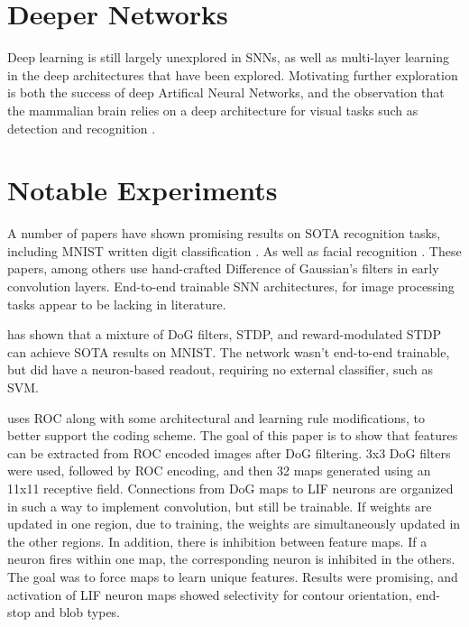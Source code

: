     \section{Deeper Networks}
    Deep learning is still largely unexplored in SNNs, as well as multi-layer
    learning in the deep architectures that have been explored. Motivating
    further exploration is both the success of deep Artifical Neural Networks,
    and the observation that the mammalian brain relies on a deep architecture
    for visual tasks such as detection and recognition \cite{tavanaei_2019}.
    
    \section{Notable Experiments}
    A number of papers have shown promising results on SOTA recognition tasks,
    including MNIST written digit classification \cite{mozafari_2018}. As well as
    facial recognition \cite{delorme_2001}. These papers, among others use
    hand-crafted Difference of Gaussian's filters in early convolution
    layers. End-to-end trainable SNN architectures, for image processing tasks
    appear to be lacking in literature.
    
    \cite{mozafari_2018} has shown that a mixture of DoG filters, STDP, and
    reward-modulated STDP can achieve SOTA results on MNIST. The network wasn't
    end-to-end trainable, but did have a neuron-based readout, requiring no
    external classifier, such as SVM.
    
    \cite{delorme_2001} uses ROC along with some architectural and learning rule
    modifications, to better support the coding scheme. The goal of this paper
    is to show that features can be extracted from ROC encoded images after DoG
    filtering. 3x3 DoG filters were used, followed by ROC encoding, and then 32
    maps generated using an 11x11 receptive field. Connections from DoG maps to
    LIF neurons are organized in such a way to implement convolution, but still
    be trainable. If weights are updated in one region, due to training, the
    weights are simultaneously updated in the other regions. In addition, there
    is inhibition between feature maps. If a neuron fires within one map, the
    corresponding neuron is inhibited in the others. The goal was to force maps
    to learn unique features. Results were promising, and activation of LIF
    neuron maps showed selectivity for contour orientation, end-stop and blob
    types.
    
